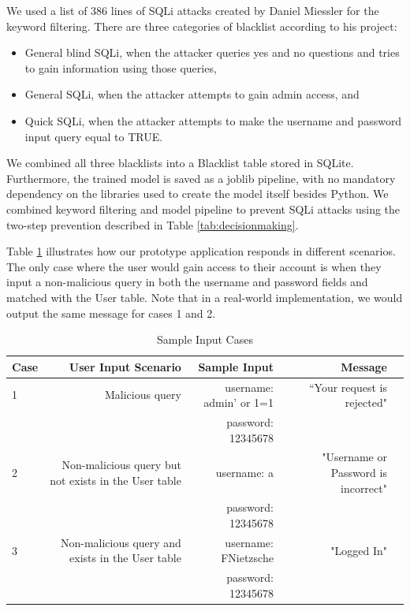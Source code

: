 \par We used a list of 386 lines of SQLi attacks created by Daniel Miessler \cite{seclist} for the keyword filtering. There are three categories of blacklist according to his project:
\begin{itemize}[
    \setlength{\IEEElabelindent}{\dimexpr-\labelwidth-\labelsep}%
    \setlength{\itemindent}{\dimexpr\labelwidth+\labelsep}%
    \setlength{\listparindent}{\parindent}%
  ]
  \item General blind SQLi, when the attacker queries yes and no questions and tries to gain information using those queries,
  \item General SQLi, when the attacker attempts to gain admin access, and
  \item Quick SQLi, when the attacker attempts to make the username and password input query equal to TRUE.
\end{itemize}
\par We combined all three blacklists into a Blacklist table stored in SQLite. Furthermore, the trained model is saved as a joblib pipeline, with no mandatory dependency on the libraries used to create the model itself besides Python. We combined keyword filtering and model pipeline to prevent SQLi attacks using the two-step prevention described in Table \ref{tab:decisionmaking}.

\par Table \ref{tab: sample-input} illustrates how our prototype application responds in different scenarios. The only case where the user would gain access to their account is when they input a non-malicious query in both the username and password fields and matched with the User table. Note that in a real-world implementation, we would output the same message for cases 1 and 2.
\begin{table}[!htp]\centering
\caption{Sample Input Cases}\label{tab: sample-input}
\scriptsize
\begin{tabular}{lrrrr}\toprule
\textbf{Case} &\textbf{User Input Scenario} &\textbf{Sample Input} &\textbf{Message} \\\midrule
\multirow{}{}{1} &\multirow{}{}{Malicious query} &username: admin' or 1=1 &\multirow{}{}{“Your request is rejected"} \\
& &password: 12345678 & \\
\multirow{}{}{2} &\multirow{}{}{Non-malicious query but not exists in the User table} &username: a &\multirow{}{}{"Username or Password is incorrect"} \\
& &password: 12345678 & \\
\multirow{}{}{3} &\multirow{}{}{Non-malicious query and exists in the User table} &username: FNietzsche &\multirow{}{}{"Logged In"} \\
& &password: 12345678 & \\
\bottomrule
\end{tabular}
\end{table}

